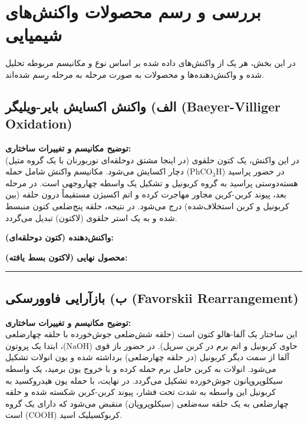 \documentclass[12pt,a4paper]{article}
\begin{document}
\section*{بررسی و رسم محصولات واکنش‌های شیمیایی}
در این بخش، هر یک از واکنش‌های داده شده بر اساس نوع و مکانیسم مربوطه تحلیل شده و واکنش‌دهنده‌ها و محصولات به صورت مرحله به مرحله رسم شده‌اند.

\vspace{0.5cm}

\subsection*{الف) واکنش اکسایش بایر-ویلیگر (Baeyer-Villiger Oxidation)}
\textbf{توضیح مکانیسم و تغییرات ساختاری:} \\
در این واکنش، یک کتون حلقوی (در اینجا مشتق دوحلقه‌ای نوربورنان با یک گروه متیل) در حضور پراسید ($\text{PhCO}_3\text{H}$) دچار اکسایش می‌شود. مکانیسم واکنش شامل حمله هسته‌دوستی پراسید به گروه کربونیل و تشکیل یک واسطه چهاروجهی است. در مرحله بعد، پیوند کربن-کربن مجاور مهاجرت کرده و اتم اکسیژن مستقیماً درون حلقه (بین کربونیل و کربن استخلاف‌شده) درج می‌شود. در نتیجه، حلقه پنج‌ضلعی کتون منبسط شده و به یک استر حلقوی (لاکتون) تبدیل می‌گردد.

\vspace{0.5cm}
\textbf{واکنش‌دهنده (کتون دوحلقه‌ای):}
\begin{center}
\end{center}

\vspace{1cm}
\textbf{محصول نهایی (لاکتون بسط یافته):}
\begin{center}
\end{center}

\vspace{1cm}
\hrule
\vspace{1cm}

\subsection*{ب) بازآرایی فاوورسکی (Favorskii Rearrangement)}
\textbf{توضیح مکانیسم و تغییرات ساختاری:} \\
این ساختار یک آلفا-هالو کتون است (حلقه شش‌ضلعی جوش‌خورده با حلقه چهارضلعی حاوی کربونیل و اتم برم در کربن سرپل). در حضور باز قوی ($\text{NaOH}$)، ابتدا یک پروتون آلفا از سمت دیگر کربونیل (در حلقه چهارضلعی) برداشته شده و یون انولات تشکیل می‌شود. انولات به کربن حامل برم حمله کرده و با خروج یون برمید، یک واسطه سیکلوپروپانون جوش‌خورده تشکیل می‌گردد. در نهایت، با حمله یون هیدروکسید به کربونیل این واسطه به شدت تحت فشار، پیوند کربن-کربن شکسته شده و حلقه چهارضلعی به یک حلقه سه‌ضلعی (سیکلوپروپان) منقبض می‌شود که دارای یک گروه کربوکسیلیک اسید ($\text{COOH}$) است.
\end{document}
